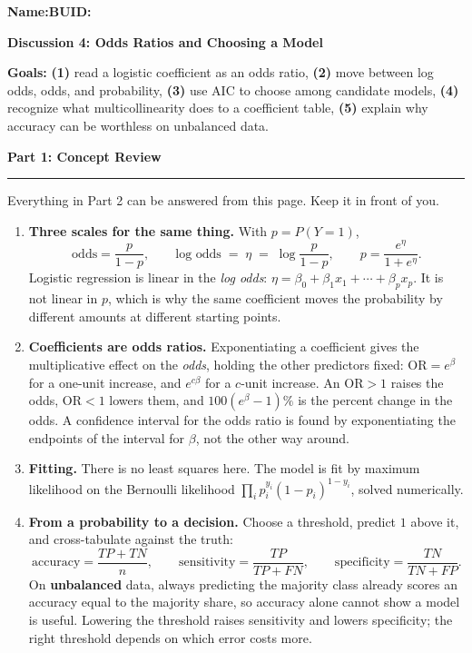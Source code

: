 \documentclass[11pt]{article}
\newcommand{\blankline}[1]{\underline{\hspace{#1}}}
\newcommand{\parttitle}[1]{%
  \par\medskip\noindent
  {\large\bfseries #1}\par
  \vspace{-.5em}\noindent\rule{\linewidth}{0.4pt}\par\smallskip}
\begin{document}
\noindent\textbf{Name:}\blankline{2.3in}\hfill\textbf{BUID:}\blankline{1.6in}

\begin{center}
  {\Large\bfseries Discussion 4: Odds Ratios and Choosing a Model}
\end{center}

\noindent\textbf{Goals:} \textbf{(1)} read a logistic coefficient as an odds ratio,
\textbf{(2)} move between log odds, odds, and probability, \textbf{(3)} use AIC to choose among
candidate models, \textbf{(4)} recognize what multicollinearity does to a coefficient table,
\textbf{(5)} explain why accuracy can be worthless on unbalanced data.

\parttitle{Part 1: Concept Review}

{\small

\noindent Everything in Part 2 can be answered from this page. Keep it in front of you.

\begin{enumerate}[label=\textbf{\arabic*.}, wide=0pt, itemsep=.5em, topsep=.5em]

\item \textbf{Three scales for the same thing.} With $p = P(Y = 1)$,
\[
\text{odds} = \frac{p}{1-p},
\qquad
\text{log odds} \;=\; \eta \;=\; \log\!\frac{p}{1-p},
\qquad
p = \frac{e^{\eta}}{1+e^{\eta}} .
\]
Logistic regression is linear in the \emph{log odds}:
$\eta = \beta_0 + \beta_1 x_1 + \cdots + \beta_p x_p$. It is not linear in $p$, which is why the
same coefficient moves the probability by different amounts at different starting points.

\item \textbf{Coefficients are odds ratios.} Exponentiating a coefficient gives the multiplicative
effect on the \emph{odds}, holding the other predictors fixed:
$\text{OR} = e^{\beta}$ for a one-unit increase, and $e^{c\beta}$ for a $c$-unit increase. An
$\text{OR} > 1$ raises the odds, $\text{OR} < 1$ lowers them, and
$100(e^{\beta}-1)\%$ is the percent change in the odds. A confidence interval for the odds ratio
is found by exponentiating the endpoints of the interval for $\beta$, not the other way around.

\item \textbf{Fitting.} There is no least squares here. The model is fit by maximum likelihood on
the Bernoulli likelihood $\prod_i p_i^{y_i}(1-p_i)^{1-y_i}$, solved numerically.

\item \textbf{From a probability to a decision.} Choose a threshold, predict $1$ above it, and
cross-tabulate against the truth:
\[
\text{accuracy} = \frac{TP+TN}{n},
\qquad
\text{sensitivity} = \frac{TP}{TP+FN},
\qquad
\text{specificity} = \frac{TN}{TN+FP}.
\]
On \textbf{unbalanced} data, always predicting the majority class already scores an accuracy equal
to the majority share, so accuracy alone cannot show a model is useful. Lowering the threshold
raises sensitivity and lowers specificity; the right threshold depends on which error costs more.


\end{enumerate}}
\end{document}
